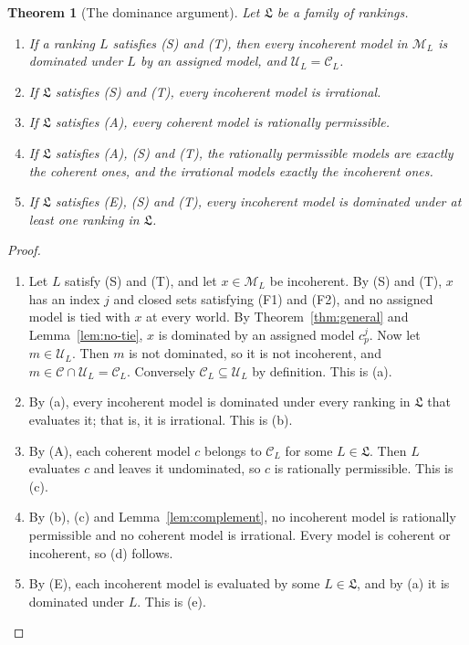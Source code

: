 \documentclass[11pt]{article}
\newtheorem{theorem}{Theorem}[section]
\theoremstyle{definition}
\theoremstyle{remark}
\newcommand{\M}{\mathcal M}
\newcommand{\C}{\mathcal C}
\newcommand{\U}{\mathcal U}
\newcommand{\Lf}{\mathfrak L}
\begin{document}
\begin{theorem}[The dominance argument]\label{thm:argument}
Let $\Lf$ be a family of rankings.
\begin{enumerate}[label=(\alph*)]
\item If a ranking $L$ satisfies {\color{red}(S)} and {\color{red}(T)}, then every incoherent model in $\M_L$ is dominated under $L$ by an assigned model, and $\U_L=\C_L$.
\item If $\Lf$ satisfies {\color{red}(S)} and {\color{red}(T)}, every incoherent model is irrational.
\item If $\Lf$ satisfies (A), every coherent model is rationally permissible.
\item If $\Lf$ satisfies (A), {\color{red}(S)} and {\color{red}(T)}, the rationally permissible models are exactly the coherent ones, and the irrational models exactly the incoherent ones.
\item If $\Lf$ satisfies (E), {\color{red}(S)} and {\color{red}(T)}, every incoherent model is dominated under at least one ranking in $\Lf$.
\end{enumerate}
\end{theorem}
\begin{proof}
\leavevmode
\begin{enumerate}[label=\arabic*.,leftmargin=*]
\item Let $L$ satisfy {\color{red}(S)} and {\color{red}(T)}, and let $x\in\M_L$ be incoherent. {\color{red}By (S) and (T), $x$ has an index $j$ and closed sets satisfying (F1) and (F2), and no assigned model is tied with $x$ at every world. By Theorem~\ref{thm:general} and Lemma~\ref{lem:no-tie}, $x$ is dominated by an assigned model $c^j_p$.} Now let $m\in\U_L$. Then $m$ is not dominated, so it is not incoherent, and $m\in\C\cap\U_L=\C_L$. Conversely $\C_L\subseteq\U_L$ by definition. This is (a).
\item By (a), every incoherent model is dominated under every ranking in $\Lf$ that evaluates it; that is, it is irrational. This is (b).
\item By (A), each coherent model $c$ belongs to $\C_L$ for some $L\in\Lf$. Then $L$ evaluates $c$ and leaves it undominated, so $c$ is rationally permissible. This is (c).
\item By (b), (c) and Lemma~\ref{lem:complement}, no incoherent model is rationally permissible and no coherent model is irrational. Every model is coherent or incoherent, so (d) follows.
\item By (E), each incoherent model is evaluated by some $L\in\Lf$, and by (a) it is dominated under $L$. This is (e).\qedhere
\end{enumerate}
\end{proof}
\end{document}
